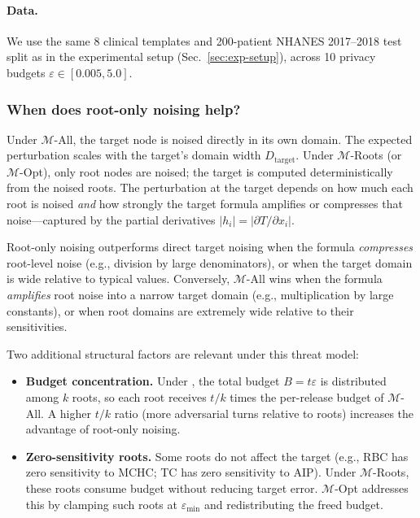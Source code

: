 \paragraph{\textbf{Data.}} We use the same 8 clinical templates and 200-patient NHANES 2017--2018 test split as in the experimental setup (Sec.~\ref{sec:exp-setup}), across 10 privacy budgets $\varepsilon \in [0.005, 5.0]$.

\subsubsection{\textbf{When does root-only noising help?}}
Under $\mathcal{M}$-All, the target node is noised directly in its own domain. The expected perturbation scales with the target's domain width $D_{\mathrm{target}}$. Under $\mathcal{M}$-Roots (or $\mathcal{M}$-Opt), only root nodes are noised; the target is computed deterministically from the noised roots. The perturbation at the target depends on how much each root is noised \emph{and} how strongly the target formula amplifies or compresses that noise---captured by the partial derivatives $|h_i| = |\partial T / \partial x_i|$.

Root-only noising outperforms direct target noising when the formula \emph{compresses} root-level noise (e.g., division by large denominators), or when the target domain is wide relative to typical values. Conversely, $\mathcal{M}$-All wins when the formula \emph{amplifies} root noise into a narrow target domain (e.g., multiplication by large constants), or when root domains are extremely wide relative to their sensitivities.

Two additional structural factors are relevant under this threat model:
\begin{itemize}
    \item \textbf{Budget concentration.} Under \sysname{}, the total budget $B = t\varepsilon$ is distributed among $k$ roots, so each root receives $t/k$ times the per-release budget of $\mathcal{M}$-All. A higher $t/k$ ratio (more adversarial turns relative to roots) increases the advantage of root-only noising.
    \item \textbf{Zero-sensitivity roots.} Some roots do not affect the target (e.g., RBC has zero sensitivity to MCHC; TC has zero sensitivity to AIP). Under $\mathcal{M}$-Roots, these roots consume budget without reducing target error. $\mathcal{M}$-Opt addresses this by clamping such roots at $\varepsilon_{\min}$ and redistributing the freed budget.
\end{itemize}

